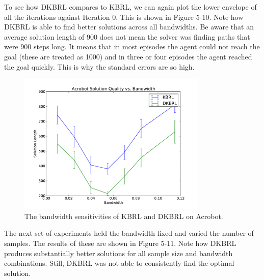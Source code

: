 To see how DKBRL compares to KBRL, we can again plot the lower envelope of
all the iterations against Iteration 0. This is shown in Figure 5-10.
Note how DKBRL is able to find better solutions across all bandwidths.
Be aware that an average solution length of 900 does not mean the solver was
finding paths that were 900 steps long.
It means that in most episodes the agent could not reach the goal
(these are treated as 1000) and in three or four episodes the agent reached
the goal quickly.
This is why the standard errors are so high.

\begin{figure}[!!!ht]
  \centering
    \includegraphics[width=90mm]{figs/chap5/acroband2.pdf}
  \caption[Bandwidth sensitivities of KBRL and DKBRL on Acrobot]
{The bandwidth sensitivities of KBRL and DKBRL on Acrobot.}
\end{figure}

The next set of experiments held the bandwidth fixed and varied the number of
samples.
The results of these are shown in Figure 5-11.
Note how DKBRL produces substantially better solutions for all sample size and bandwidth
combinations.
Still, DKBRL was not able to consistently find the optimal solution.


